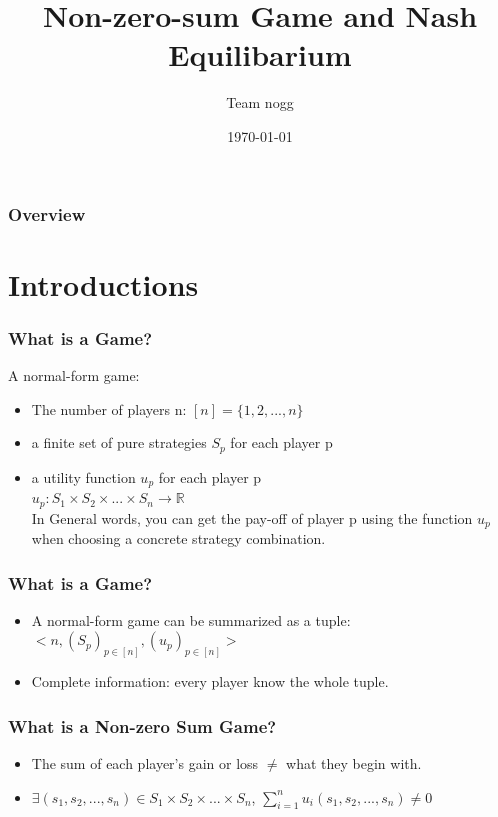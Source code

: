 \documentclass{beamer}
\title[Short title]{Non-zero-sum Game and Nash Equilibarium}
\author{Team nogg}
\institute[SJTU]
{

}
\date{\today}
\begin{document}
\begin{frame}
\titlepage
\end{frame}

\begin{frame}
\frametitle{Overview}
\tableofcontents
\end{frame}

\section{Introductions}
\begin{frame}
\frametitle{What is a Game?}
A normal-form game:\\
\begin{itemize}
\item The {\color{red} number} of players n: $[n] = \{1,2,...,n\}$
\item a finite {\color{red} set of pure strategies} $S_p$ for each player p
\item a {\color{red} utility function} $u_p$ for each player p\\
        \qquad $u_p : S_1 \times S_2 \times ... \times S_n  \rightarrow \mathbb{R}$\\
        In General words, you can get the pay-off of player p using the function $u_p$ when choosing a concrete strategy combination.
\end{itemize}
\end{frame}

\begin{frame}
\frametitle{What is a Game?}
\begin{itemize}
\item A normal-form game can be summarized as a tuple:\\
        \qquad $<n, (S_p)_{p\in [n]}, (u_p)_{p\in [n]}>$
\item Complete information: every player know the whole tuple.
\end{itemize}

\end{frame}


\begin{frame}
\frametitle{What is a Non-zero Sum Game?}
\begin{itemize}
\item
The sum of each player's gain or loss $\neq$ what they begin with.
\item
$\exists (s_1,s_2,...,s_n)\in S_1\times S_2 \times ... \times S_n$, $\sum_{i=1}^{n} u_i(s_1,s_2,...,s_n) \neq 0$
\end{itemize}
\end{frame}
\end{document}
